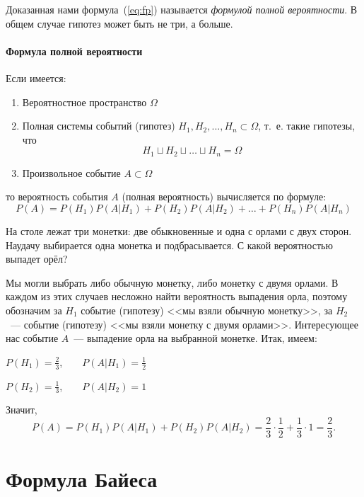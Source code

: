 \documentclass[11pt]{article}
\begin{document}
Доказанная нами формула~(\ref{eq:fp}) называется \emph{формулой полной
вероятности}. В общем случае гипотез может быть не три, а больше.

\paragraph{Формула полной вероятности} Если имеется:
\begin{enumerate}
    \item Вероятностное пространство $\Omega$
    \item Полная системы событий (гипотез) $H_1, H_2,..., H_n \subset \Omega$,
    т.~е. такие гипотезы, что $$H_1 \sqcup H_2 \sqcup \dots \sqcup H_n = \Omega$$
    \item Произвольное событие $A \subset \Omega$
\end{enumerate}
то вероятность события $A$ (полная вероятность) вычисляется по формуле:
$$P(A)
=P(H_1)P(A \vert H_1)+P(H_2)P(A \vert H_2)+\dots+P(H_n)P(A \vert H_n)$$

\begin{example}

    На столе лежат три монетки: две обыкновенные и одна с орлами с двух сторон.
    Наудачу выбирается одна монетка и подбрасывается. С какой вероятностью выпадет
    орёл?

    Мы могли выбрать либо обычную монетку, либо монетку с двумя орлами. В каждом
    из этих случаев несложно найти вероятность выпадения орла, поэтому обозначим
    за $H_1$ событие (гипотезу) <<мы взяли обычную монетку>>, за $H_2$~---
    событие (гипотезу) <<мы взяли монетку с двумя орлами>>. Интересующее нас
    событие $A$~--- выпадение орла на выбранной монетке. Итак, имеем:

\vspace{0.2em}

$P(H_1)=\frac{2}{3}$,~~~~$P(A \vert H_1)=\frac{1}{2}$

\nopagebreak
\vspace{0.2em}

\nopagebreak
$P(H_2)=\frac{1}{3}$,~~~~$P(A \vert H_2)=1$

\vspace{0.2em}

Значит, $$P(A)
=P(H_1)P(A \vert H_1)+P(H_2)P(A \vert H_2)
=\frac{2}{3}\cdot\frac{1}{2}+\frac{1}{3}\cdot1=\frac{2}{3}.$$

\end{example}

\section{Формула Байеса}
\end{document}

